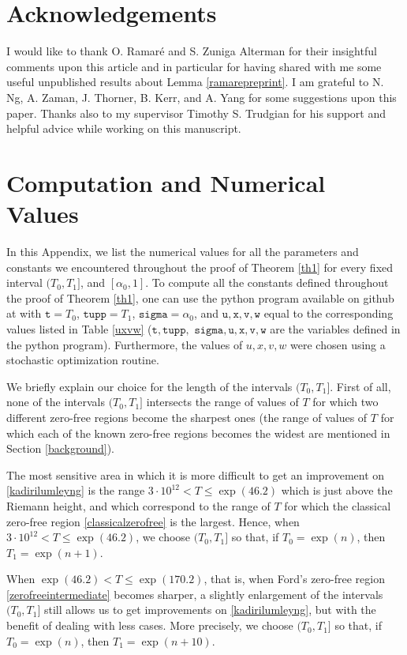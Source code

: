 \documentclass[reqno]{amsart}
\numberwithin{equation}{section}
\theoremstyle{remark}
\begin{document}
\section*{Acknowledgements}
I would like to thank O. Ramaré and S. Zuniga Alterman for their
insightful comments upon this article and in particular for having shared with me some useful unpublished results about Lemma \ref{ramarepreprint}. I am grateful to N. Ng, A. Zaman, J. Thorner, B. Kerr, and A. Yang for some suggestions upon this paper. Thanks also to my supervisor Timothy S. Trudgian for his support and helpful advice while working on this manuscript.
\appendix
\section{Computation and Numerical Values}\label{numerical}
In this Appendix, we list the numerical values for all the parameters and constants we encountered throughout the proof of Theorem \ref{th1} for every fixed interval $(T_0,T_1]$, and $[\alpha_0,1]$. To compute all the constants defined throughout the proof of Theorem \ref{th1}, one can use the python program available on github at \cite{Bellotti_Log-free} with $\texttt{t}=T_0$, $\texttt{tupp}=T_1$, $\texttt{sigma}=\alpha_0$, and $\texttt{u},\texttt{x},\texttt{v},\texttt{w}$ equal to the corresponding values listed in Table \ref{uxvw} ($\texttt{t},\texttt{tupp},$ $\texttt{sigma},\texttt{u},\texttt{x},\texttt{v},\texttt{w}$ are the variables defined in the python program). Furthermore, the values of $u,x,v,w$ were chosen using a stochastic optimization routine.

We briefly explain our choice for the length of the intervals $(T_0,T_1]$. First of all, none of the intervals $(T_0,T_1]$ intersects the range of values of $T$ for which two different zero-free regions become the sharpest ones (the range of values of $T$ for which each of the known zero-free regions becomes the widest are mentioned in Section \ref{background}).

The most sensitive area in which it is more difficult to get an improvement on \eqref{kadirilumleyng} is the range $3\cdot 10^{12}< T\le\exp(46.2)$ which is just above the Riemann height, and which correspond to the range of $T$ for which the classical zero-free region \eqref{classicalzerofree} is the largest. Hence, when $3\cdot 10^{12}<T\le \exp(46.2)$, we choose $(T_0,T_1]$ so that, if $T_0=\exp(n)$, then $T_1=\exp(n+1)$.

When $\exp(46.2)<T\le \exp(170.2)$, that is, when Ford's zero-free region \eqref{zerofreeintermediate} becomes sharper, a slightly enlargement of the intervals $(T_0,T_1]$ still allows us to get improvements on \eqref{kadirilumleyng}, but with the benefit of dealing with less cases. More precisely, we choose $(T_0,T_1]$ so that, if $T_0=\exp(n)$, then $T_1=\exp(n+10)$.
\end{document}
